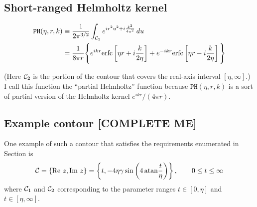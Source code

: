 \documentclass[letterpaper]{article}
\newcommand{\erfc}{\text{erfc}}
\begin{document}
\subsection*{Short-ranged Helmholtz kernel}

\begin{align}
  \texttt{PH}(\eta,r,k)
  &\equiv
  \frac{1}{2\pi^{3/2}}
  \int_{\mc C_2} e^{ ir^2 u^2 + i\frac{k^2}{4u^2}}\, du
\nn
  &=
   \frac{1}{8\pi r}
     \Bigg\{ e^{ ikr} \erfc\left[  \eta r
                                 +i\frac{k}{2\eta}\right]
            +e^{-ikr} \erfc\left[  \eta r 
                                 -i\frac{k}{2\eta}\right]
     \Bigg\}
  \label{PHDefinition}
\end{align}

(Here $\mathcal{C}_2$ is the portion of the contour that 
covers the real-axis interval $[\eta,\infty]$.)
I call this function the ``partial Helmholtz'' function 
because $\texttt{PH}(\eta, r, k)$ is a sort of partial
version of the Helmholtz kernel $e^{ikr}/(4\pi r).$

\subsection{Example contour [COMPLETE ME]}

One example of such a contour that satisfies the requirements 
enumerated in Section \label{ContourIntegralSection} is
$$ \mathcal{C} 
    = \{ \text{Re } z, \text{Im } z\}
    = \left\{ t, -4\eta\gamma \sin\left(4\, \text{atan} \frac{t}{\eta}\right)\right\},
      \qquad 0\le t \le \infty
$$
where $\mathcal{C}_1$ and $\mathcal{C}_2$ corresponding to the parameter ranges
$t\in [0,\eta]$ and $t\in[\eta,\infty]$.
\end{document}
